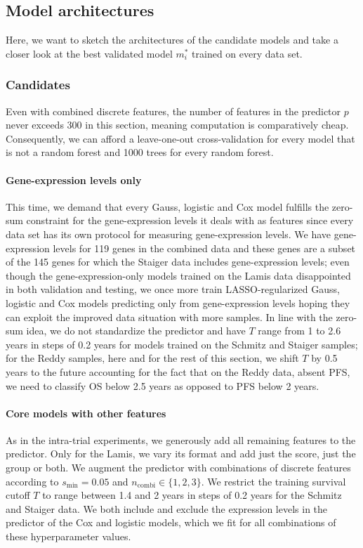 \subsection{Model architectures}

Here, we want to sketch the architectures of the candidate models and take a closer look at the 
best validated model $m_i^*$ trained on every data set.

\subsubsection{Candidates}

Even with combined discrete features, the number of features in the predictor $p$ 
never exceeds \num{300} in this section, meaning computation is comparatively cheap. 
Consequently, we can afford 
a leave-one-out cross-validation for every model that is not a random forest and \num{1000} trees 
for every random forest.

\paragraph{Gene-expression levels only}
This time, we demand that every Gauss, logistic and Cox model fulfills the zero-sum constraint for 
the gene-expression levels it deals with as features since every data set has its own protocol for 
measuring gene-expression levels. We have gene-expression levels for \num{119} genes in the 
combined data and these genes are a subset of the \num{145} genes for which the Staiger data 
includes gene-expression levels; even though the gene-expression-only models trained on the Lamis 
data disappointed in both validation and testing, we once more train LASSO-regularized Gauss, 
logistic and Cox models predicting only from gene-expression levels hoping they can exploit the 
improved data situation with more samples. In line with the zero-sum idea, we do not standardize 
the predictor and have $T$ range from \num{1} to \num{2.6} years in steps of \num{0.2} years for 
models trained on the Schmitz and Staiger samples; for the Reddy samples, here and for the rest 
of this section, we shift $T$ by
\num{0.5} years to the future accounting for the fact that on the Reddy data, absent PFS, we need 
to classify OS below \num{2.5} years as opposed to PFS below \num{2} years.

\paragraph{Core models with other features}
As in the intra-trial experiments, we generously add all remaining features to the predictor. Only 
for the Lamis, we vary its format and add just the score, just the group or both. We augment the 
predictor with combinations of discrete features according to $s_\text{min} = \num{0.05}$ and 
$n_\text{combi} \in \{ 1, 2, 3 \}$. We restrict the training survival cutoff $T$ to range between 
\num{1.4} and \num{2} years in steps of \num{0.2} years for the Schmitz and Staiger data. We 
both include and exclude the expression levels in the predictor of the Cox and logistic 
models, which we fit for all combinations of these hyperparameter values.

